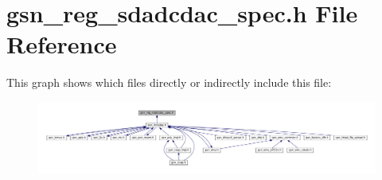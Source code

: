 \hypertarget{a00569}{
\section{gsn\_\-reg\_\-sdadcdac\_\-spec.h File Reference}
\label{a00569}
}
This graph shows which files directly or indirectly include this file:
\nopagebreak
\begin{figure}[H]
\begin{center}
\leavevmode
\includegraphics[width=400pt]{a00806}
\end{center}
\end{figure}
